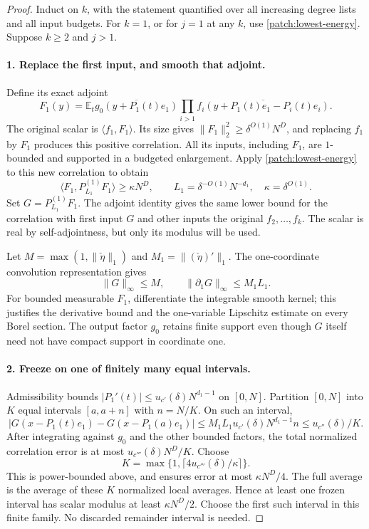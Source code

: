 \documentclass[11pt]{article}
\theoremstyle{definition}
\begin{document}
\begin{proof}
Induct on $k$, with the statement quantified over all increasing degree lists and all input
budgets.  For $k=1$, or for $j=1$ at any $k$, use \cref{patch:lowest-energy}.
Suppose $k\geq2$ and $j>1$.

\paragraph{1. Replace the first input, and smooth that adjoint.}
Define its exact adjoint
\[
 F_1(y)=\mathbb E_t\overline{g_0(y+P_1(t)e_1)}
                  \prod_{i>1}\overline{f_i(y+P_1(t)e_1-P_i(t)e_i)}.
\]
The original scalar is $\langle f_1,F_1\rangle$.  Its size gives
$\|F_1\|_2^2\geq\delta^{O(1)}N^D$, and replacing $f_1$ by $F_1$ produces this positive
correlation.  All its inputs, including $F_1$, are $1$-bounded and supported in a budgeted
enlargement.  Apply \cref{patch:lowest-energy} to this new correlation to obtain
\[
 \langle F_1,P_{L_1}^{(1)}F_1\rangle\geq\kappa N^D,
 \qquad L_1=\delta^{-O(1)}N^{-d_1},\quad\kappa=\delta^{O(1)}.
\]
Set $G=P_{L_1}^{(1)}F_1$.  The adjoint identity gives the same lower bound for the
correlation with first input $G$ and other inputs the original $f_2,\ldots,f_k$.
The scalar is real by self-adjointness, but only its modulus will be used.

Let $M=\max(1,\|\check\eta\|_1)$ and $M_1=\| (\check\eta)'\|_1$.
The one-coordinate convolution representation gives
\[
 \|G\|_\infty\leq M,\qquad \|\partial_1G\|_\infty\leq M_1L_1.
\]
For bounded measurable $F_1$, differentiate the integrable smooth kernel; this justifies the
derivative bound and the one-variable Lipschitz estimate on every Borel section.
The output factor $g_0$ retains finite support even though $G$ itself need not have compact
support in coordinate one.

\paragraph{2. Freeze on one of finitely many equal intervals.}
Admissibility bounds $|P_1'(t)|\leq u_{c'}(\delta)N^{d_1-1}$ on $[0,N]$.
Partition $[0,N]$ into $K$ equal intervals $[a,a+n]$ with $n=N/K$.
On such an interval,
\[
 |G(x-P_1(t)e_1)-G(x-P_1(a)e_1)|
 \leq M_1L_1u_{c'}(\delta)N^{d_1-1}n
 \leq u_{c''}(\delta)/K.
\]
After integrating against $g_0$ and the other bounded factors, the total normalized
correlation error is at most $u_{c'''}(\delta)N^D/K$.
Choose
\[
 K=\max\{1,\lceil 4u_{c'''}(\delta)/\kappa\rceil\}.
\]
This is power-bounded above, and ensures error at most $\kappa N^D/4$.
The full average is the average of these $K$ normalized local averages.  Hence at least one
frozen interval has scalar modulus at least $\kappa N^D/2$.
Choose the first such interval in this finite family.  No discarded remainder interval is needed.


\end{proof}
\end{document}
